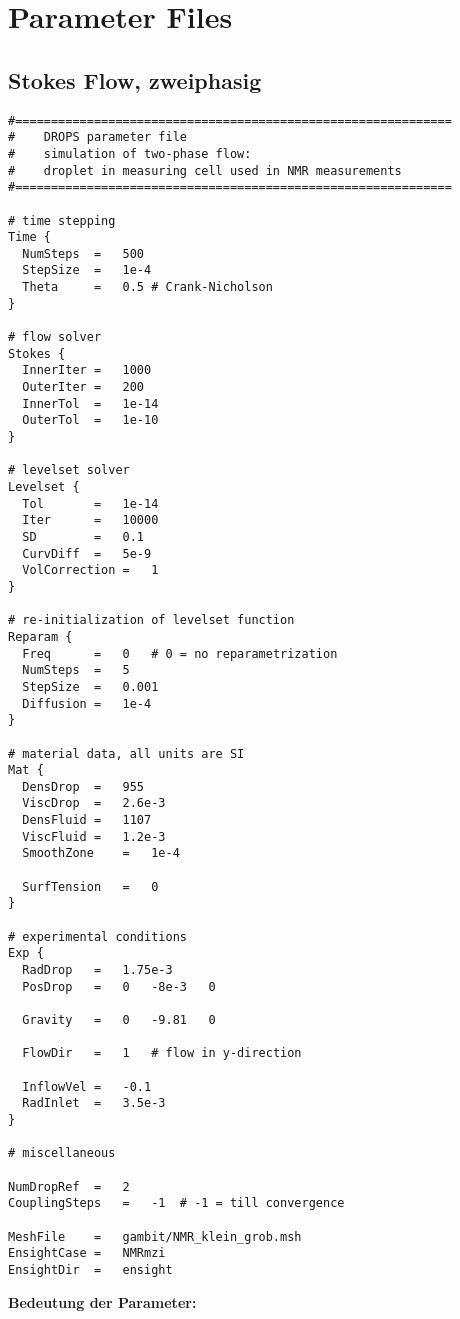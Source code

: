 
\section{Parameter Files}
\label{s:ParamFiles}

\subsection{Stokes Flow, zweiphasig}
\begin{Code}
\begin{verbatim}
#=============================================================
#    DROPS parameter file
#    simulation of two-phase flow: 
#    droplet in measuring cell used in NMR measurements
#=============================================================

# time stepping
Time {
  NumSteps	=	500
  StepSize	=	1e-4
  Theta		=	0.5	# Crank-Nicholson
}

# flow solver
Stokes {
  InnerIter	=	1000
  OuterIter	=	200
  InnerTol	=	1e-14
  OuterTol	=	1e-10
}

# levelset solver
Levelset {
  Tol		=	1e-14
  Iter		=	10000
  SD		=	0.1
  CurvDiff	=	5e-9
  VolCorrection	=	1
}

# re-initialization of levelset function
Reparam { 
  Freq		=	0	# 0 = no reparametrization
  NumSteps	=	5
  StepSize	=	0.001
  Diffusion	=	1e-4
}

# material data, all units are SI
Mat {
  DensDrop	=	955
  ViscDrop	=	2.6e-3
  DensFluid	=	1107
  ViscFluid	=	1.2e-3
  SmoothZone	=	1e-4
  
  SurfTension	=	0
}

# experimental conditions
Exp {
  RadDrop	=	1.75e-3
  PosDrop	=	0	-8e-3	0
  
  Gravity	=	0	-9.81	0
  
  FlowDir	=	1	# flow in y-direction
  
  InflowVel	=	-0.1
  RadInlet	=	3.5e-3
}  

# miscellaneous

NumDropRef	=	2
CouplingSteps	=	-1	# -1 = till convergence

MeshFile	=	gambit/NMR_klein_grob.msh
EnsightCase	=	NMRmzi
EnsightDir	=	ensight
\end{verbatim}
\end{Code}

{\bf Bedeutung der Parameter: }\\

